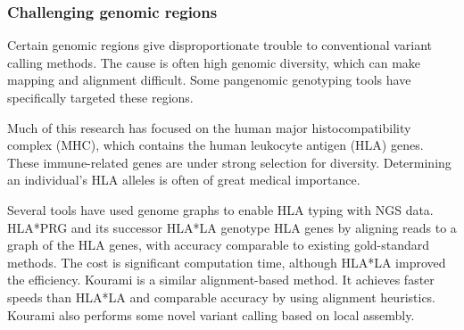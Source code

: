 %

\subsubsection{Challenging genomic regions}


Certain genomic regions give disproportionate trouble to conventional variant calling methods. 
The cause is often high genomic diversity, which can make mapping and alignment difficult. 
Some pangenomic genotyping tools have specifically targeted these regions.

Much of this research has focused on the human major histocompatibility complex (MHC), which contains the human leukocyte antigen (HLA) genes.
These immune-related genes are under strong selection for diversity.
Determining an individual's HLA alleles is often of great medical importance.

Several tools have used genome graphs to enable HLA typing with NGS data.
HLA*PRG \cite{dilthey2018hla} and its successor HLA*LA \cite{dilthey2019hla} genotype HLA genes by aligning reads to a graph of the HLA genes, with accuracy comparable to existing gold-standard methods.
The cost is significant computation time, although HLA*LA improved the efficiency.
Kourami \cite{lee2018kourami} is a similar alignment-based method.
It achieves faster speeds than HLA*LA and comparable accuracy by using alignment heuristics.
Kourami also performs some novel variant calling based on local assembly.

